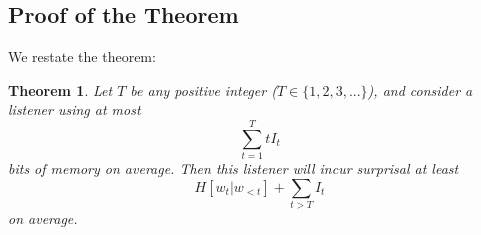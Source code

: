 \documentclass[11pt,letterpaper]{article}
\newcounter{theorem}
\newtheorem{thm}[theorem]{Theorem}
\begin{document}
%
%



\subsection{Proof of the Theorem}

We restate the theorem:

\begin{thm}\label{prop:suboptimal}
	Let $T$ be any positive integer ($T \in \{1, 2, 3, ...\}$), and consider a listener using at most
	\begin{equation}\label{eq:memory}
		\sum_{t=1}^T t I_t
	\end{equation}
bits of memory on average.
Then this listener will incur surprisal at least
	$$H[w_t|w_{<t}] + \sum_{t > T} I_t$$
	on average.
\end{thm}
\end{document}
